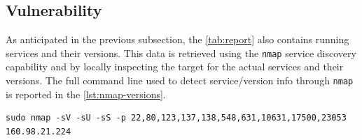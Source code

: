 \documentclass[10pt,a4paper,twoside,onecolumn]{article}
\begin{document}
\subsection{Vulnerability}

As anticipated in the previous subsection, the \autoref{tab:report} also contains running services and their versions. This data is retrieved using the \texttt{nmap} service discovery capability and by locally inspecting the target for the actual services and their versions. The full command line used to detect service/version info through \texttt{nmap} is reported in the \autoref{lst:nmap-versions}.

\lstset{caption=Command to execute service detection on the previously found open ports,label=lst:nmap-versions}
\begin{lstlisting}
sudo nmap -sV -sU -sS -p 22,80,123,137,138,548,631,10631,17500,23053 160.98.21.224
\end{lstlisting}
\end{document}
